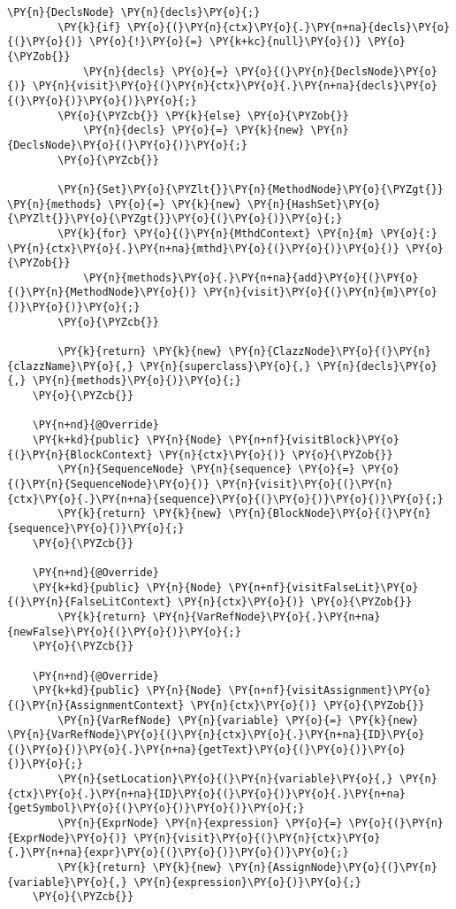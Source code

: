 \begin{Verbatim}[commandchars=\\\{\}]
        \PY{n}{DeclsNode} \PY{n}{decls}\PY{o}{;}
        \PY{k}{if} \PY{o}{(}\PY{n}{ctx}\PY{o}{.}\PY{n+na}{decls}\PY{o}{(}\PY{o}{)} \PY{o}{!}\PY{o}{=} \PY{k+kc}{null}\PY{o}{)} \PY{o}{\PYZob{}}
            \PY{n}{decls} \PY{o}{=} \PY{o}{(}\PY{n}{DeclsNode}\PY{o}{)} \PY{n}{visit}\PY{o}{(}\PY{n}{ctx}\PY{o}{.}\PY{n+na}{decls}\PY{o}{(}\PY{o}{)}\PY{o}{)}\PY{o}{;}
        \PY{o}{\PYZcb{}} \PY{k}{else} \PY{o}{\PYZob{}}
            \PY{n}{decls} \PY{o}{=} \PY{k}{new} \PY{n}{DeclsNode}\PY{o}{(}\PY{o}{)}\PY{o}{;}
        \PY{o}{\PYZcb{}}
        
        \PY{n}{Set}\PY{o}{\PYZlt{}}\PY{n}{MethodNode}\PY{o}{\PYZgt{}} \PY{n}{methods} \PY{o}{=} \PY{k}{new} \PY{n}{HashSet}\PY{o}{\PYZlt{}}\PY{o}{\PYZgt{}}\PY{o}{(}\PY{o}{)}\PY{o}{;}
        \PY{k}{for} \PY{o}{(}\PY{n}{MthdContext} \PY{n}{m} \PY{o}{:} \PY{n}{ctx}\PY{o}{.}\PY{n+na}{mthd}\PY{o}{(}\PY{o}{)}\PY{o}{)} \PY{o}{\PYZob{}}
            \PY{n}{methods}\PY{o}{.}\PY{n+na}{add}\PY{o}{(}\PY{o}{(}\PY{n}{MethodNode}\PY{o}{)} \PY{n}{visit}\PY{o}{(}\PY{n}{m}\PY{o}{)}\PY{o}{)}\PY{o}{;}
        \PY{o}{\PYZcb{}}
        
        \PY{k}{return} \PY{k}{new} \PY{n}{ClazzNode}\PY{o}{(}\PY{n}{clazzName}\PY{o}{,} \PY{n}{superclass}\PY{o}{,} \PY{n}{decls}\PY{o}{,} \PY{n}{methods}\PY{o}{)}\PY{o}{;}
    \PY{o}{\PYZcb{}}

    \PY{n+nd}{@Override}
    \PY{k+kd}{public} \PY{n}{Node} \PY{n+nf}{visitBlock}\PY{o}{(}\PY{n}{BlockContext} \PY{n}{ctx}\PY{o}{)} \PY{o}{\PYZob{}}
        \PY{n}{SequenceNode} \PY{n}{sequence} \PY{o}{=} \PY{o}{(}\PY{n}{SequenceNode}\PY{o}{)} \PY{n}{visit}\PY{o}{(}\PY{n}{ctx}\PY{o}{.}\PY{n+na}{sequence}\PY{o}{(}\PY{o}{)}\PY{o}{)}\PY{o}{;}
        \PY{k}{return} \PY{k}{new} \PY{n}{BlockNode}\PY{o}{(}\PY{n}{sequence}\PY{o}{)}\PY{o}{;}
    \PY{o}{\PYZcb{}}

    \PY{n+nd}{@Override}
    \PY{k+kd}{public} \PY{n}{Node} \PY{n+nf}{visitFalseLit}\PY{o}{(}\PY{n}{FalseLitContext} \PY{n}{ctx}\PY{o}{)} \PY{o}{\PYZob{}}
        \PY{k}{return} \PY{n}{VarRefNode}\PY{o}{.}\PY{n+na}{newFalse}\PY{o}{(}\PY{o}{)}\PY{o}{;}
    \PY{o}{\PYZcb{}}

    \PY{n+nd}{@Override}
    \PY{k+kd}{public} \PY{n}{Node} \PY{n+nf}{visitAssignment}\PY{o}{(}\PY{n}{AssignmentContext} \PY{n}{ctx}\PY{o}{)} \PY{o}{\PYZob{}}
        \PY{n}{VarRefNode} \PY{n}{variable} \PY{o}{=} \PY{k}{new} \PY{n}{VarRefNode}\PY{o}{(}\PY{n}{ctx}\PY{o}{.}\PY{n+na}{ID}\PY{o}{(}\PY{o}{)}\PY{o}{.}\PY{n+na}{getText}\PY{o}{(}\PY{o}{)}\PY{o}{)}\PY{o}{;}
        \PY{n}{setLocation}\PY{o}{(}\PY{n}{variable}\PY{o}{,} \PY{n}{ctx}\PY{o}{.}\PY{n+na}{ID}\PY{o}{(}\PY{o}{)}\PY{o}{.}\PY{n+na}{getSymbol}\PY{o}{(}\PY{o}{)}\PY{o}{)}\PY{o}{;}
        \PY{n}{ExprNode} \PY{n}{expression} \PY{o}{=} \PY{o}{(}\PY{n}{ExprNode}\PY{o}{)} \PY{n}{visit}\PY{o}{(}\PY{n}{ctx}\PY{o}{.}\PY{n+na}{expr}\PY{o}{(}\PY{o}{)}\PY{o}{)}\PY{o}{;}
        \PY{k}{return} \PY{k}{new} \PY{n}{AssignNode}\PY{o}{(}\PY{n}{variable}\PY{o}{,} \PY{n}{expression}\PY{o}{)}\PY{o}{;}
    \PY{o}{\PYZcb{}}


\end{Verbatim}
